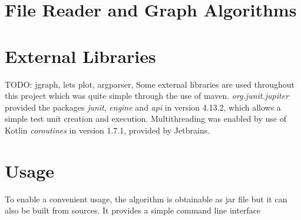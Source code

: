 \section{File Reader and Graph Algorithms}

\section{External Libraries}
TODO: jgraph, lets plot, argparser, 
Some external libraries are used throughout this project which was quite simple through the use of maven. \emph{org.junit.jupiter} provided the packages \emph{junit}, \emph{engine} and \emph{api} in version 4.13.2, which allows a simple test unit creation and execution. Multithreading was enabled by use of Kotlin \emph{coroutines} in version 1.7.1, provided by Jetbrains.

\section{Usage}
To enable a convenient usage, the algorithm is obtainable as jar file but it can also be built from sources. It provides a simple command line interface
